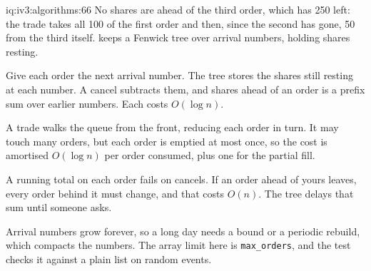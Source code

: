 \begin{solution}{iq:iv3:algorithms:66}
No shares are ahead of the third order, which has 250 left: the trade takes all 100 of the first order and then, since the second has gone, 50 from the third itself.  keeps a Fenwick tree over arrival numbers, holding shares resting.
\label{lst:iv3:al:queuepos}

Give each order the next arrival number. The tree stores the shares still resting at each number. A cancel subtracts them, and shares ahead of an order is a prefix sum over earlier numbers. Each costs $O(\log n)$.

A trade walks the queue from the front, reducing each order in turn. It may touch many orders, but each order is emptied at most once, so the cost is amortised $O(\log n)$ per order consumed, plus one for the partial fill.

A running total on each order fails on cancels. If an order ahead of yours leaves, every order behind it must change, and that costs $O(n)$. The tree delays that sum until someone asks.

Arrival numbers grow forever, so a long day needs a bound or a periodic rebuild, which compacts the numbers. The array limit here is \texttt{max\_orders}, and the test checks it against a plain list on random events.

\end{solution}

